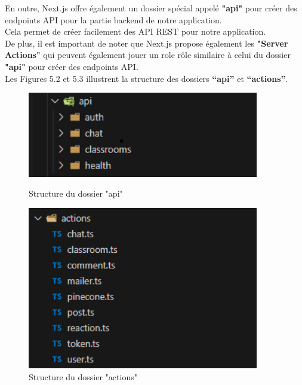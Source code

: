 \newpage
\noindent En outre, Next.js offre également un dossier spécial appelé \textbf{"api"} pour créer des endpoints API pour la partie backend de notre application.\\
Cela permet de créer facilement des API REST pour notre application.\\
De plus, il est important de noter que Next.js propose également les \textbf{"Server Actions"} qui peuvent également jouer un role rôle similaire à celui du dossier \textbf{"api"} pour créer des endpoints API.\\
Les Figures 5.2 et 5.3 illustrent la structure des dossiers \textbf{“api”} et \textbf{“actions”}.
\begin{figure}[H]
    \centering
    \begin{minipage}[b]{0.45\textwidth}
        \centering
        \includegraphics[width=0.9\textwidth,height=0.45\textwidth]{images/chp5/fig2.png}
        \caption{Structure du dossier "api"}
        \label{fig:Structure du dossier "api"}
    \end{minipage}
    \hspace{0.05\textwidth}
    \begin{minipage}[b]{0.45\textwidth}
        \centering
        \includegraphics[width=0.9\textwidth,height=0.9\textwidth]{images/chp5/fig3.png}
        \caption{Structure du dossier "actions"}
        \label{fig:Structure du dossier "actions"}
    \end{minipage}
\end{figure}


